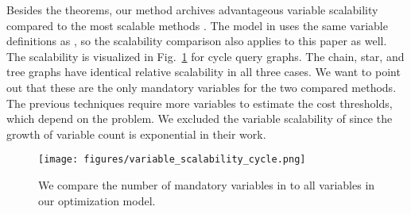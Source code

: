 Besides the theorems, our method archives advantageous variable scalability compared to the most scalable methods \cite{Schonberger_Scherzinger_Mauerer, 10.14778/3632093.3632112}. The model in \cite{DBLP:conf/q-data/SaxenaSS24} uses the same variable definitions as \cite{10.14778/3632093.3632112}, so the scalability comparison also applies to this paper as well. The scalability is visualized in Fig.~\ref{fig:variable_scalability_cycle} for cycle query graphs. The chain, star, and tree graphs have identical relative scalability in all three cases. We want to point out that these are the only mandatory variables for the two compared methods. The previous techniques require more variables to estimate the cost thresholds, which depend on the problem. We excluded the variable scalability of \cite{Nayak_Winker_Groppe_Groppe_2024} since the growth of variable count is exponential in their work.

\begin{figure}
    \centering
    \texttt{[image: figures/variable\_scalability\_cycle.png]}
    \caption{We compare the number of mandatory variables in \cite{Schonberger_Scherzinger_Mauerer,10.14778/3632093.3632112} to all variables in our optimization model.}
    \label{fig:variable_scalability_cycle}
\end{figure}